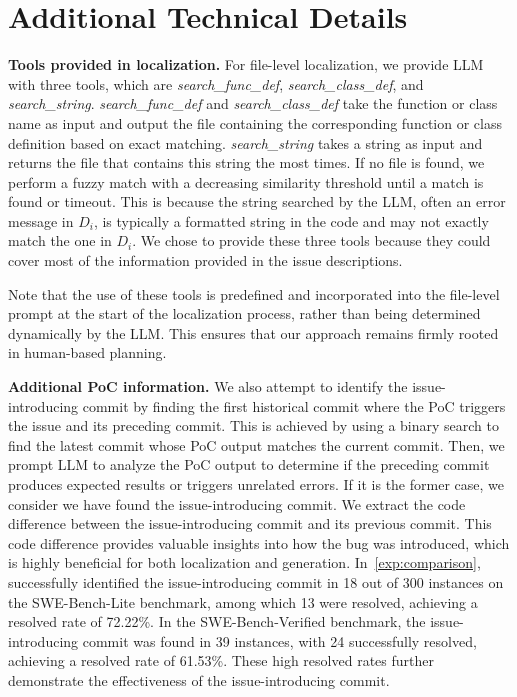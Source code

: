 \section{Additional Technical Details}
\label{appx:tech}

\noindent\textbf{Tools provided in localization.} 
For file-level localization, we provide LLM with three tools, which are \textit{search\_func\_def}, \textit{search\_class\_def}, and \textit{search\_string}.
\textit{search\_func\_def} and \textit{search\_class\_def} take the function or class name as input and output the file containing the corresponding function or class definition based on exact matching. 
\textit{search\_string} takes a string as input and returns the file that contains this string the most times. 
If no file is found, we perform a fuzzy match with a decreasing similarity threshold until a match is found or timeout. 
This is because the string searched by the LLM, often an error message in $D_i$, is typically a formatted string in the code and may not exactly match the one in $D_i$.
We chose to provide these three tools because they could cover most of the information provided in the issue descriptions.

Note that the use of these tools is predefined and incorporated into the file-level prompt at the start of the localization process, rather than being determined dynamically by the LLM. 
This ensures that our approach remains firmly rooted in human-based planning.

\noindent\textbf{Additional PoC information.} 
We also attempt to identify the issue-introducing commit by finding the first historical commit where the PoC triggers the issue and its preceding commit. 
This is achieved by using a binary search to find the latest commit whose PoC output matches the current commit.
Then, we prompt LLM to analyze the PoC output to determine if the preceding commit produces expected results or triggers unrelated errors. 
If it is the former case, we consider we have found the issue-introducing commit. We extract the code difference between the issue-introducing commit and its previous commit. 
This code difference provides valuable insights into how the bug was introduced, which is highly beneficial for both localization and generation. 
In~\cref{exp:comparison}, \sys successfully identified the issue-introducing commit in 18 out of 300 instances on the SWE-Bench-Lite benchmark, among which 13 were resolved, achieving a resolved rate of 72.22\%.
In the SWE-Bench-Verified benchmark, the issue-introducing commit was found in 39 instances, with 24 successfully resolved, achieving a resolved rate of 61.53\%. These high resolved rates further demonstrate the effectiveness of the issue-introducing commit.


